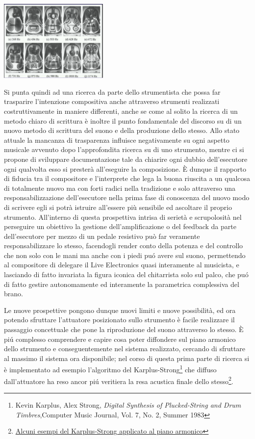 \documentclass[oneside]{article}
\begin{document}
\begin{multicols*}{2}
\includegraphics[width=0.4\textwidth]{img/chladni1.png}

Si punta quindi ad una ricerca da parte dello strumentista che possa far trasparire l'intenzione compositiva anche attraverso strumenti realizzati costruttivamente in maniere differenti, anche se come al solito la ricerca di un metodo chiaro di scrittura è inoltre il punto fondamentale del discorso su di un nuovo metodo di scrittura del suono e della produzione dello stesso. Allo stato attuale la mancanza di trasparenza influisce negativamente su ogni aspetto musicale avvenuto dopo l'approfondita ricerca su di uno strumento, mentre ci si propone di sviluppare documentazione tale da chiarire ogni dubbio dell'esecutore ogni qualvolta esso si presterà all'eseguire la composizione. È dunque il rapporto di fiducia tra il compositore e l'interprete che lega la buona riuscita a un qualcosa di totalmente nuovo ma con forti radici nella tradizione e solo attraverso una responsabilizzazione dell'esecutore nella prima fase di conoscenza del nuovo modo di scrivere egli si potrà istruire all'essere più sensibile ed ascoltare il proprio strumento. All'interno di questa prospettiva intrisa di serietà e scrupolosità nel perseguire un obiettivo la gestione dell'amplificazione o del feedback da parte dell'esecutore per mezzo di un pedale resistivo può far veramente responsabilizzare lo stesso, facendogli render conto della potenza e del controllo che non solo con le mani ma anche con i piedi puó avere sul suono, permettendo al compositore di delegare il Live Electronics quasi interamente al musicista, e lasciando di fatto invariata la figura iconica del chitarrista solo sul palco, che puó di fatto gestire autonomamente ed interamente la parametrica complessiva del brano.

Le nuove prospettive pongono dunque nuovi limiti e nuove possibilità, ed ora potendo sfruttare l'attuatore posizionato sullo strumento è facile realizzare il passaggio concettuale che pone la riproduzione del suono attraverso lo stesso. È piú complesso comprendere e capire cosa poter diffondere sul piano armonico dello strumento e conseguentemente nel sistema realizzato, cercando di sfruttare al massimo il sistema ora disponibile; nel corso di questa prima parte di ricerca si è implementato  ad esempio  l'algoritmo del Karplus-Strong\footnote{Kevin Karplus, Alex Strong, \emph{Digital Synthesis of Plucked-String and Drum Timbres},Computer Music Journal, Vol. 7, No. 2, Summer 1983} che diffuso dall'attuatore ha reso ancor piú veritiera la resa acustica finale dello stesso\footnote{\href{https://github.com/SMERM/BN-Tedesco/tree/master/COME-02/Lezioni_in_Compresenza/20200331/Esempi_Karplus-Strong_Attuatore_su_chitarra}{Alcuni esempi del Karplus-Strong applicato al piano armonico}}.


\end{multicols*}
\end{document}
